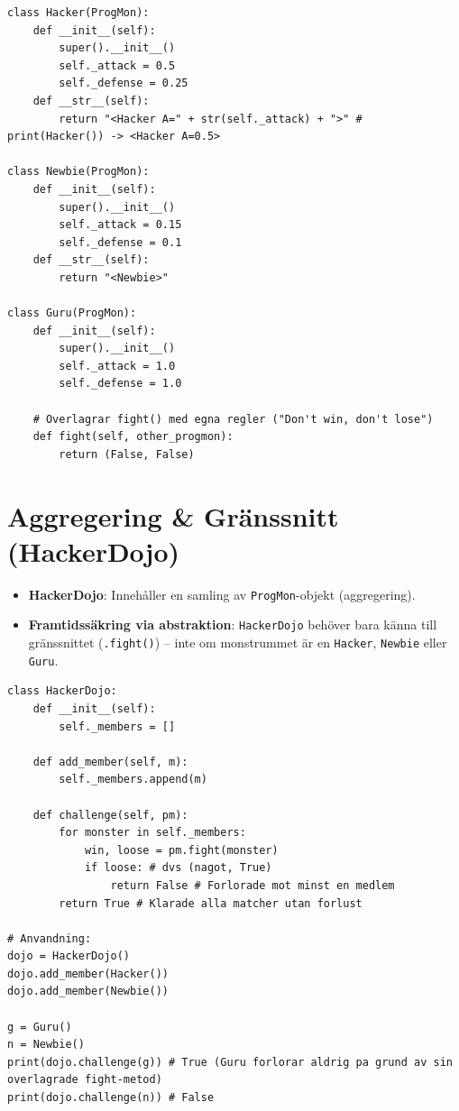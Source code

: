 \documentclass[10pt,a4paper]{report}
\begin{document}
\begin{lstlisting}
class Hacker(ProgMon):
    def __init__(self):
        super().__init__()
        self._attack = 0.5
        self._defense = 0.25
    def __str__(self):
        return "<Hacker A=" + str(self._attack) + ">" # print(Hacker()) -> <Hacker A=0.5>

class Newbie(ProgMon):
    def __init__(self):
        super().__init__()
        self._attack = 0.15
        self._defense = 0.1
    def __str__(self):
        return "<Newbie>"

class Guru(ProgMon):
    def __init__(self):
        super().__init__()
        self._attack = 1.0
        self._defense = 1.0

    # Overlagrar fight() med egna regler ("Don't win, don't lose")
    def fight(self, other_progmon):
        return (False, False)
\end{lstlisting}

\section{Aggregering \& Gränssnitt (HackerDojo)}

\begin{itemize}[leftmargin=*]
  \item \textbf{HackerDojo}: Innehåller en samling av \texttt{ProgMon}-objekt (aggregering).
  \item \textbf{Framtidssäkring via abstraktion}: \texttt{HackerDojo} behöver bara känna till gränssnittet (\texttt{.fight()}) – inte om monstrummet är en \texttt{Hacker}, \texttt{Newbie} eller \texttt{Guru}.
\end{itemize}

\begin{lstlisting}
class HackerDojo:
    def __init__(self):
        self._members = []

    def add_member(self, m):
        self._members.append(m)

    def challenge(self, pm):
        for monster in self._members:
            win, loose = pm.fight(monster)
            if loose: # dvs (nagot, True)
                return False # Forlorade mot minst en medlem
        return True # Klarade alla matcher utan forlust

# Anvandning:
dojo = HackerDojo()
dojo.add_member(Hacker())
dojo.add_member(Newbie())

g = Guru()
n = Newbie()
print(dojo.challenge(g)) # True (Guru forlorar aldrig pa grund av sin overlagrade fight-metod)
print(dojo.challenge(n)) # False
\end{lstlisting}
\end{document}
